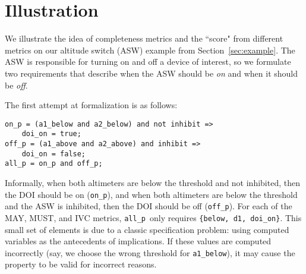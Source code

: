 \section{Illustration}
\label{sec:illust}

\newcommand{\allp}{\texttt{all\_p}}
\newcommand{\onp}{\texttt{on\_p}}
\newcommand{\offp}{\texttt{off\_p}}
\newcommand{\hystp}{\texttt{hyst\_p}}
\newcommand{\aonebelow}{\texttt{a1\_below}}
\newcommand{\atwobelow}{\texttt{a2\_below}}
\newcommand{\aoneabove}{\texttt{a1\_above}}
\newcommand{\atwoabove}{\texttt{a2\_above}}
\newcommand{\doion}{\texttt{doi\_on}}
\newcommand{\done}{\texttt{d1}}
\newcommand{\dtwo}{\texttt{d2}}
\newcommand{\abovehyst}{\texttt{above\_hyst}}
\newcommand{\inhibit}{\texttt{inhibit}}

We illustrate the idea of completeness metrics and the ``score" from different metrics on our altitude switch (ASW) example from Section~\ref{sec:example}.  %
%
The ASW is responsible for turning on and off a device of interest, so we formulate two requirements that describe when the ASW should be {\em on} and when it should be {\em off}.

The first attempt at formalization is as follows:

{\smaller
\begin{verbatim}
on_p = (a1_below and a2_below) and not inhibit =>
    doi_on = true;
off_p = (a1_above and a2_above) and inhibit =>
    doi_on = false;
all_p = on_p and off_p;
\end{verbatim}
}

\noindent Informally, when both altimeters are below the threshold and not inhibited, then the DOI should be on (\onp), and when both altimeters are below the threshold and the ASW is inhibited, then the DOI should be off (\offp).
For each of the MAY, MUST, and IVC metrics, \allp\ only requires \texttt{\{below, d1, doi\_on\}}.   This small set of elements is due to a classic specification problem: using computed variables as the antecedents of implications.  If these values are computed incorrectly (say, we choose the wrong threshold for \aonebelow), it may cause the property to be valid for incorrect reasons.



